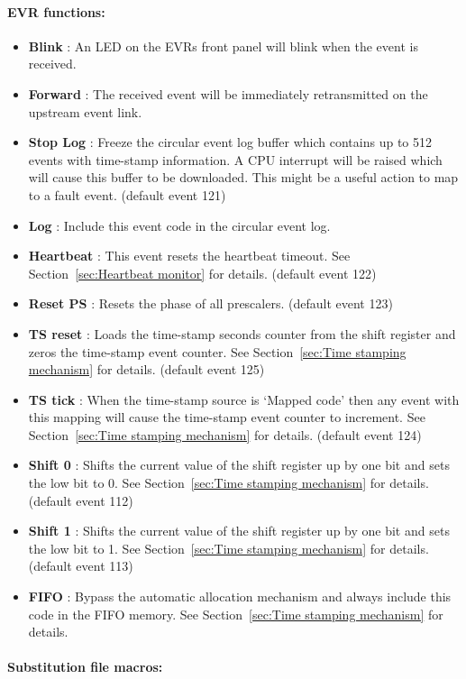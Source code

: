 \documentclass[12pt,a4paper]{article}
\begin{document}
\paragraph{EVR functions:}
\begin{itemize}
\item
  \textbf{Blink} : An LED on the EVRs front panel will blink when the
  event is received.
\item
  \textbf{Forward} : The received event will be immediately retransmitted
  on the upstream event link.
\item
  \textbf{Stop Log} : Freeze the circular event log buffer which contains up to 512 events with time-stamp information. A CPU interrupt will be raised which will cause this buffer to be downloaded. This might be a useful action to map to a fault event. (default event 121)
\item
  \textbf{Log} : Include this event code in the circular event log.
\item
  \textbf{Heartbeat} : This event resets the heartbeat timeout. See Section~\ref{sec:Heartbeat monitor} for details. (default event 122)
\item
  \textbf{Reset PS} : Resets the phase of all prescalers. (default event 123)
\item
  \textbf{TS reset} : Loads the time-stamp seconds counter from the shift register and zeros the time-stamp event counter. See Section~\ref{sec:Time stamping mechanism} for details. (default event 125)
\item
  \textbf{TS tick} : When the time-stamp source is `Mapped code' then any event with this mapping will cause the time-stamp event counter to increment. See Section~\ref{sec:Time stamping mechanism} for details. (default event 124)
\item
  \textbf{Shift 0} : Shifts the current value of the shift register up by one bit and sets the low bit to 0. See Section~\ref{sec:Time stamping mechanism} for details. (default event 112)
\item
  \textbf{Shift 1} : Shifts the current value of the shift register up by one bit and sets the low bit to 1. See Section~\ref{sec:Time stamping mechanism} for details. (default event 113)
\item
  \textbf{FIFO} : Bypass the automatic allocation mechanism and always include this code in the FIFO memory. See Section~\ref{sec:Time stamping mechanism} for details.
\end{itemize}

\paragraph{Substitution file macros:}
\end{document}
